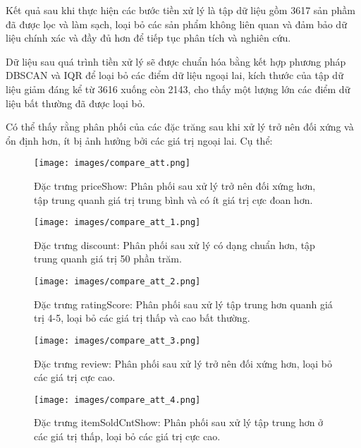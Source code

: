 Kết quả sau khi thực hiện các bước tiền xử lý là tập dữ liệu  gồm 3617 sản phầm đã được lọc và làm sạch, loại bỏ các sản phẩm không liên quan và đảm bảo dữ liệu chính xác và đầy đủ hơn để tiếp tục phân tích và nghiên cứu.

Dữ liệu sau quá trình tiền xử lý sẽ được chuẩn hóa bằng kết hợp phương pháp DBSCAN và IQR để loại bỏ các điểm dữ liệu ngoại lai, kích thước của tập dữ liệu giảm đáng kể từ 3616 xuống còn 2143, cho thấy một lượng lớn các điểm dữ liệu bất thường đã được loại bỏ.

Có thể thấy rằng phân phối của các đặc trăng sau khi xử lý trở nên đối xứng và ổn định hơn, ít bị ảnh hưởng bởi các giá trị ngoại lai. Cụ thể:

\begin{figure}[H]
    \centering
    \texttt{[image: images/compare\_att.png]}
    \caption{Đặc trưng priceShow: Phân phối sau xử lý trở nên đối xứng hơn, tập trung quanh giá trị trung bình và có ít giá trị cực đoan hơn.}
    \label{fig:piechart_item_listed}
\end{figure}

\begin{figure}[H]
    \centering
    \texttt{[image: images/compare\_att\_1.png]}
    \caption{Đặc trưng discount: Phân phối sau xử lý có dạng chuẩn hơn, tập trung quanh giá trị 50 phần trăm.}
    \label{fig:piechart_item_listed}
\end{figure}

\begin{figure}[H]
    \centering
    \texttt{[image: images/compare\_att\_2.png]}
    \caption{Đặc trưng ratingScore: Phân phối sau xử lý tập trung hơn quanh giá trị 4-5, loại bỏ các giá trị thấp và cao bất thường.}
    \label{fig:piechart_item_listed}
\end{figure}

\begin{figure}[H]
    \centering
    \texttt{[image: images/compare\_att\_3.png]}
    \caption{Đặc trưng review: Phân phối sau xử lý trở nên đối xứng hơn, loại bỏ các giá trị cực cao.}
    \label{fig:piechart_item_listed}
\end{figure}

\begin{figure}[H]
    \centering
    \texttt{[image: images/compare\_att\_4.png]}
    \caption{Đặc trưng itemSoldCntShow: Phân phối sau xử lý tập trung hơn ở các giá trị thấp, loại bỏ các giá trị cực cao.}
    \label{fig:piechart_item_listed}
\end{figure}

